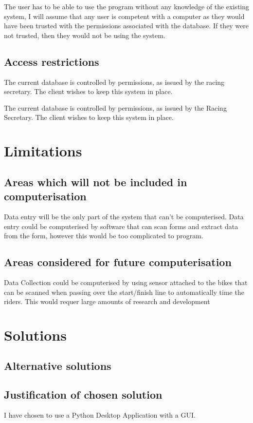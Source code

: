 The user has to be able to use the program without any knowledge of the existing system, I will assume that any user is competent with a computer as they would have been trusted with the permissions associated with the database. If they were not trusted, then they would not be using the system.

\subsection{Access restrictions}

The current database is controlled by permissions, as issued by the racing secretary. The client wishes to keep this system in place.

The current database is controlled by permissions, as issued by the Racing Secretary. The client wishes to keep this system in place.

\section{Limitations}

\subsection{Areas which will not be included in computerisation}
Data entry will be the only part of the system that can't be computerised. Data entry could be computerised by software that can scan forms and extract data from the form, however this would be too complicated to program.
\subsection{Areas considered for future computerisation}
Data Collection could be computerised by using sensor attached to the bikes that can be scanned when passing over the start/finish line to automatically time the riders. This would requer large amounts of research and development
\section{Solutions}

\subsection{Alternative solutions}

\subsection{Justification of chosen solution}
I have chosen to use a Python Desktop Application with a GUI.
